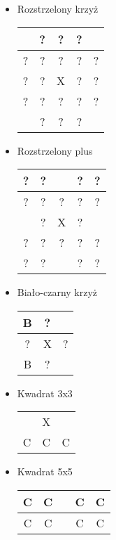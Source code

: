 \begin{itemize}
\begin{tabular}{|c|c|c|}
\end{tabular}
\item Rozstrzelony krzyż
\begin{tabular}{|c|c|c|c|c|}
    \hline
    \cellcolor{black} & ? & ? &?&\cellcolor{black}\\
    \hline
    ? & ?& ? &?&?\\
    \hline
    ? & ? & X&?&?\\ 
    \hline
    ? & ? & ?&?&?\\ 
    \hline
    \cellcolor{black} & ? & ?&?&\cellcolor{black}\\ 
    \hline
\end{tabular}
\item Rozstrzelony plus
\begin{tabular}{|c|c|c|c|c|}
    \hline
    ? & ? & \cellcolor{black} &?&?\\
    \hline
    ? & ? & ? &?&?\\
    \hline
    \cellcolor{black} & ? & X&?&\cellcolor{black}\\ 
    \hline
    ? & ? & ?&?&?\\ 
    \hline
    ? & ? & \cellcolor{black}&?&?\\ 
    \hline
\end{tabular}
\item Biało-czarny krzyż
\begin{tabular}{|c|c|c|}
    \hline
    B & ? &\cellcolor{black} \\
    \hline
    ? & X & ? \\
    \hline
    B & ? & \cellcolor{black} \\
    \hline
\end{tabular}
\item Kwadrat 3x3
\begin{tabular}{|c|c|c|}
    \hline
    \cellcolor{black} &\cellcolor{black} & \cellcolor{black} \\
    \hline
    \cellcolor{black} & X & \cellcolor{black} \\
    \hline
    \cellcolor{black}C &\cellcolor{black}C & \cellcolor{black}C \\
    \hline
\end{tabular}
\item Kwadrat 5x5
\begin{tabular}{|c|c|c|c|c|}
    \hline
    \cellcolor{black}C & \cellcolor{black}C & \cellcolor{black} &\cellcolor{black}C&\cellcolor{black}C\\
    \hline
    \cellcolor{black}C & \cellcolor{black}C & \cellcolor{black} &\cellcolor{black}C&\cellcolor{black}C\\

\end{tabular}
\end{itemize}

